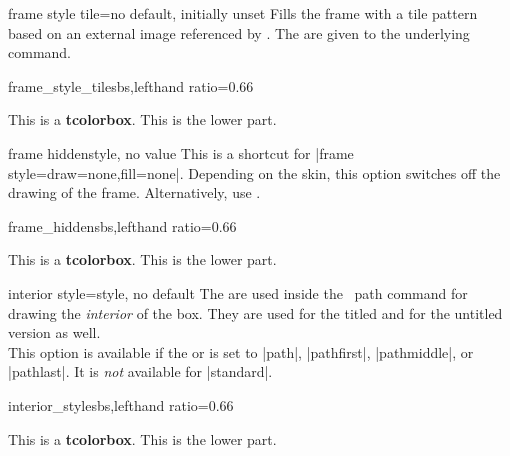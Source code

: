 \clearpage
\begin{docTcbKey}{frame style tile}{=}{no default, initially unset}
  Fills the frame with a tile pattern based on an external image referenced by .
  The  are given to the underlying  command.
\begin{exdispExample*}{frame_style_tile}{sbs,lefthand ratio=0.66}

\begin{tcolorbox}[enhanced,title=My title,
  frame style tile={width=1cm}{pink_marble.png}]
This is a \textbf{tcolorbox}.
\tcblower
This is the lower part.
\end{tcolorbox}
\end{exdispExample*}
\end{docTcbKey}


\begin{docTcbKey}{frame hidden}{}{style, no value}
  This is a shortcut for |frame style={draw=none,fill=none}|.
  Depending on the skin, this option switches off the drawing of the
  frame.
  Alternatively, use .
\begin{exdispExample*}{frame_hidden}{sbs,lefthand ratio=0.66}

\begin{tcolorbox}[enhanced,title=My title,
  frame hidden]
This is a \textbf{tcolorbox}.
\tcblower
This is the lower part.
\end{tcolorbox}
\end{exdispExample*}
\end{docTcbKey}


\begin{docTcbKey}{interior style}{=}{style, no default}
  The  are used inside the \tikzname\ path command
  for drawing the \emph{interior} of the box. They are used for the titled
  and for the untitled version as well.\\
  This option is available if the 
  or  is set to
  |path|, |pathfirst|, |pathmiddle|, or |pathlast|.
  It is \emph{not} available for |standard|.
\begin{exdispExample*}{interior_style}{sbs,lefthand ratio=0.66}

\begin{tcolorbox}[enhanced,title=My title,
  interior style={left color=red!20!white,
                  right color=yellow!50!white}]
This is a \textbf{tcolorbox}.
\tcblower
This is the lower part.
\end{tcolorbox}
\end{exdispExample*}
\end{docTcbKey}

